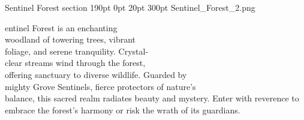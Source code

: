 \def\primarycolor{titlered}%
\def\secondarycolor{white}%
\MonsterBannerGraphic%
	{Sentinel Forest}%
	{section}%
	{190pt}%
	{0pt} %
	{20pt} %
	{300pt}%
	{Sentinel_Forest_2.png}%
	{}%
%
\vspace*{10pt}
\entryfont \noindent {}entinel Forest is an enchanting\\woodland of towering trees, vibrant\\foliage, and serene tranquility. Crystal-\\clear streams wind through the forest,\\offering sanctuary to diverse wildlife. Guarded by\\mighty Grove Sentinels, fierce protectors of nature's\\balance, this sacred realm radiates beauty and mystery. Enter with reverence to embrace the forest's harmony or risk the wrath of its guardians.


